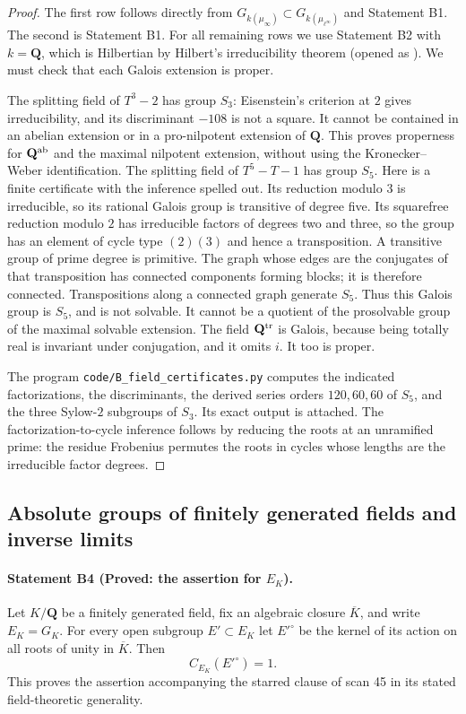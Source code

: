 \begin{proof}
The first row follows directly from
$G_{k(\mu_\infty)}\subset G_{k(\mu_{\ell^\infty})}$ and Statement B1.
The second is Statement B1. For all remaining rows we use Statement B2
with $k=\mathbf Q$, which is Hilbertian by Hilbert's irreducibility theorem
(opened as \cite[\S4, Theorem 1]{B_Geyer2012}). We must check that each
Galois extension is proper.

The splitting field of $T^3-2$ has group $S_3$: Eisenstein's criterion at
$2$ gives irreducibility, and its discriminant $-108$ is not a square.
It cannot be contained in an abelian extension or in a pro-nilpotent
extension of $\mathbf Q$. This proves properness for $\mathbf Q^{\rm ab}$
and the maximal nilpotent extension, without using the Kronecker--Weber
identification. The splitting field of $T^5-T-1$ has group $S_5$.
Here is a finite certificate with the inference spelled out. Its reduction
modulo $3$ is irreducible, so its rational Galois group is transitive of
degree five. Its squarefree reduction modulo $2$ has irreducible factors
of degrees two and three, so the group has an element of cycle type
$(2)(3)$ and hence a transposition. A transitive group of prime degree is
primitive. The graph whose edges are the conjugates of that transposition
has connected components forming blocks; it is therefore connected.
Transpositions along a connected graph generate $S_5$.
Thus this Galois group is $S_5$, and is not solvable. It cannot be a quotient
of the prosolvable group of the maximal solvable extension. The field
$\mathbf Q^{\rm tr}$ is Galois, because being totally real is invariant
under conjugation, and it omits $i$. It too is proper.

The program \texttt{code/B\_field\_certificates.py} computes the indicated
factorizations, the discriminants, the derived series orders
$120,60,60$ of $S_5$, and the three Sylow-$2$ subgroups of $S_3$.
Its exact output is attached. The factorization-to-cycle inference follows
by reducing the roots at an unramified prime: the residue Frobenius permutes
the roots in cycles whose lengths are the irreducible factor degrees.
\end{proof}

\subsection{Absolute groups of finitely generated fields and inverse limits}

\paragraph{Statement B4 (Proved: the assertion for $E_K$).}\label{res:B4}
Let $K/\mathbf Q$ be a finitely generated field, fix an algebraic closure
$\overline K$, and write $E_K=G_K$. For every open subgroup $E'\subset E_K$
let $E'^\circ$ be the kernel of its action on all roots of unity in
$\overline K$. Then
\[
 C_{E_K}(E'^\circ)=1.
\]
This proves the assertion accompanying the starred clause of scan 45 in
its stated field-theoretic generality.

